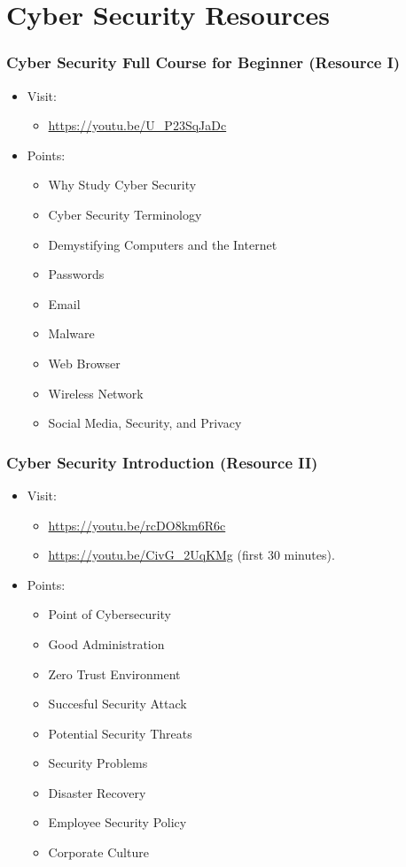 \documentclass[aspectratio=169, xcolor=table, notheorems, hyperref={pdfpagelabels=false}]{beamer}
\begin{document}
\section{Cyber Security Resources}
\begin{frame}[fragile]
\frametitle{Cyber Security Full Course for Beginner (Resource I)}

\begin{itemize}
\item Visit:
\begin{itemize}
\item \url{https://youtu.be/U_P23SqJaDc}
\end{itemize}
\item Points:
\begin{itemize}
\item Why Study Cyber Security
\item Cyber Security Terminology
\item Demystifying Computers and the Internet
\item Passwords
\item Email
\item Malware
\item Web Browser
\item Wireless Network
\item Social Media, Security, and Privacy
\end{itemize}
\end{itemize}
\end{frame}


\begin{frame}[fragile]
\frametitle{Cyber Security Introduction (Resource II)}

\begin{itemize}
\item Visit:
\begin{itemize}
\item \url{https://youtu.be/rcDO8km6R6c}
\item \url{https://youtu.be/CivG_2UqKMg} (first 30 minutes).
\end{itemize}
\item Points:
\begin{itemize}
\item Point of Cybersecurity
\item Good Administration
\item Zero Trust Environment
\item Succesful Security Attack
\item Potential Security Threats
\item Security Problems
\item Disaster Recovery
\item Employee Security Policy
\item Corporate Culture
\end{itemize}
\end{itemize}
\end{frame}
\end{document}
